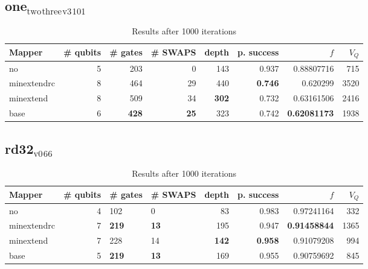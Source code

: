 \documentclass[11pt]{article}
\begin{document}
\subsection{one\(_{\text{two}}\)\(_{\text{three}}\)\(_{\text{v3}}\)\(_{\text{101}}\)}
\label{sec:org3608c70}
\begin{table}[H]
\caption{\label{tab:org094d57c}
Results after 1000 iterations}
\centering
\small
\begin{tabular}{lrrrrrrr}
\hline
Mapper & \# qubits & \# gates & \# SWAPS & depth & p. success & \(f\) & \(V_Q\)\\
\hline
no & 5 & 203 & 0 & 143 & 0.937 & 0.88807716 & 715\\
\hline
minextendrc & 8 & 464 & 29 & 440 & \textbf{0.746} & 0.620299 & 3520\\
minextend & 8 & 509 & 34 & \textbf{302} & 0.732 & 0.63161506 & 2416\\
base & 6 & \textbf{428} & \textbf{25} & 323 & 0.742 & \textbf{0.62081173} & 1938\\
\hline
\end{tabular}
\end{table}
\subsection{rd32\(_{\text{v0}}\)\(_{\text{66}}\)}
\label{sec:org0994c07}
\begin{table}[H]
\caption{\label{tab:org6ccb411}
Results after 1000 iterations}
\centering
\small
\begin{tabular}{lrllrrrr}
\hline
Mapper & \# qubits & \# gates & \# SWAPS & depth & p. success & \(f\) & \(V_Q\)\\
\hline
no & 4 & 102 & 0 & 83 & 0.983 & 0.97241164 & 332\\
\hline
minextendrc & 7 & \textbf{219} & \textbf{13} & 195 & 0.947 & \textbf{0.91458844} & 1365\\
minextend & 7 & 228 & 14 & \textbf{142} & \textbf{0.958} & 0.91079208 & 994\\
base & 5 & \textbf{219} & \textbf{13} & 169 & 0.955 & 0.90759692 & 845\\
\hline
\end{tabular}
\end{table}
\end{document}
